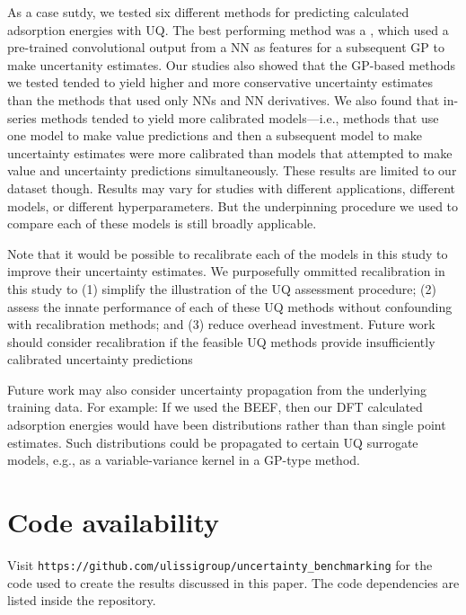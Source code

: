 \documentclass[]{achemso}
\begin{document}
As a case sutdy, we tested six different methods for predicting  calculated adsorption energies with \gls{UQ}.
The best performing method was a , which used a pre-trained convolutional output from a \gls{NN} as features for a subsequent \gls{GP} to make uncertanity estimates.
Our studies also showed that the \gls{GP}-based methods we tested tended to yield higher and more conservative uncertainty estimates than the methods that used only \gls{NN}s and \gls{NN} derivatives.
We also found that in-series methods tended to yield more calibrated models---i.e., methods that use one model to make value predictions and then a subsequent model to make uncertainty estimates were more calibrated than models that attempted to make value and uncertainty predictions simultaneously.
These results are limited to our dataset though.
Results may vary for studies with different applications, different models, or different hyperparameters.
But the underpinning procedure we used to compare each of these models is still broadly applicable.

Note that it would be possible to recalibrate\cite{Kuleshov2018} each of the models in this study to improve their uncertainty estimates.
We purposefully ommitted recalibration in this study to (1) simplify the illustration of the \gls{UQ} assessment procedure; (2) assess the innate performance of each of these UQ methods without confounding with recalibration methods; and (3) reduce overhead investment.
Future work should consider recalibration if the feasible UQ methods provide insufficiently calibrated uncertainty predictions

Future work may also consider uncertainty propagation from the underlying training data.
For example:  If we used the \gls{BEEF},\cite{Wellendorff2012} then our \gls{DFT} calculated adsorption energies would have been distributions rather than than single point estimates.
Such distributions could be propagated to certain \gls{UQ} surrogate models, e.g., as a variable-variance kernel in a \gls{GP}-type method.



\section*{Code availability} Visit \texttt{https://github.com/ulissigroup/uncertainty\_benchmarking} for the code used to create the results discussed in this paper.
The code dependencies are listed inside the repository.
\end{document}

